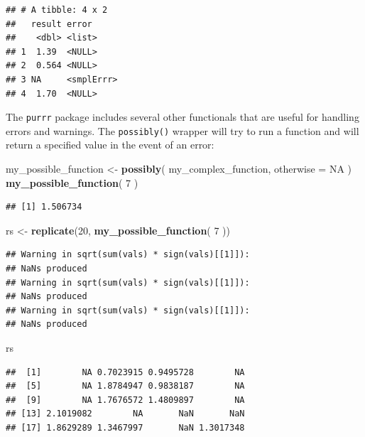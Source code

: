 \documentclass[
]{book}
\newenvironment{Shaded}{\begin{snugshade}}{\end{snugshade}}
\newcommand{\AttributeTok}[1]{\textcolor[rgb]{0.13,0.29,0.53}{#1}}
\newcommand{\ConstantTok}[1]{\textcolor[rgb]{0.56,0.35,0.01}{#1}}
\newcommand{\DecValTok}[1]{\textcolor[rgb]{0.00,0.00,0.81}{#1}}
\newcommand{\FunctionTok}[1]{\textcolor[rgb]{0.13,0.29,0.53}{\textbf{#1}}}
\newcommand{\NormalTok}[1]{#1}
\newcommand{\OtherTok}[1]{\textcolor[rgb]{0.56,0.35,0.01}{#1}}
\begin{document}
\begin{verbatim}
## # A tibble: 4 x 2
##   result error     
##    <dbl> <list>    
## 1  1.39  <NULL>    
## 2  0.564 <NULL>    
## 3 NA     <smplErrr>
## 4  1.70  <NULL>
\end{verbatim}

The \texttt{purrr} package includes several other functionals that are useful for handling errors and warnings.
The \texttt{possibly()} wrapper will try to run a function and will return a specified value in the event of an error:

\begin{Shaded}
\begin{Highlighting}[]
\NormalTok{my\_possible\_function }\OtherTok{\textless{}{-}} \FunctionTok{possibly}\NormalTok{( my\_complex\_function, }\AttributeTok{otherwise =} \ConstantTok{NA}\NormalTok{ )}
\FunctionTok{my\_possible\_function}\NormalTok{( }\DecValTok{7}\NormalTok{ )}
\end{Highlighting}
\end{Shaded}

\begin{verbatim}
## [1] 1.506734
\end{verbatim}

\begin{Shaded}
\begin{Highlighting}[]
\NormalTok{rs }\OtherTok{\textless{}{-}} \FunctionTok{replicate}\NormalTok{(}\DecValTok{20}\NormalTok{, }\FunctionTok{my\_possible\_function}\NormalTok{( }\DecValTok{7}\NormalTok{ ))}
\end{Highlighting}
\end{Shaded}

\begin{verbatim}
## Warning in sqrt(sum(vals) * sign(vals)[[1]]):
## NaNs produced
## Warning in sqrt(sum(vals) * sign(vals)[[1]]):
## NaNs produced
## Warning in sqrt(sum(vals) * sign(vals)[[1]]):
## NaNs produced
\end{verbatim}

\begin{Shaded}
\begin{Highlighting}[]
\NormalTok{rs}
\end{Highlighting}
\end{Shaded}

\begin{verbatim}
##  [1]        NA 0.7023915 0.9495728        NA
##  [5]        NA 1.8784947 0.9838187        NA
##  [9]        NA 1.7676572 1.4809897        NA
## [13] 2.1019082        NA       NaN       NaN
## [17] 1.8629289 1.3467997       NaN 1.3017348
\end{verbatim}
\end{document}
